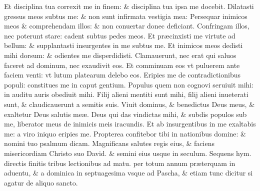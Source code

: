 \documentclass[a5paper,10pt]{book}
\def\ae{æ}
\begin{document}
\begin{multicols*}{2}
\newline \color{red} E\color{black}t disciplina tua correxit me in finem: \& disciplina tua ipsa me docebit.
\newline \color{red} D\color{black}ilatasti gressus meos subtus me: \& non sunt infirmata vestigia mea:
\newline \color{red} P\color{black}ersequar inimicos meos \& comprehendam illos: \& non conuertar donec deficiant.
\newline \color{red} C\color{black}onfringam illos, nec poterunt stare: cadent subtus pedes meos.
\newline \color{red} E\color{black}t pr\ae cinxisti me virtute ad bellum: \& supplantasti insurgentes in me subtus me.
\newline \color{red} E\color{black}t inimicos meos dedisti mihi dorsum: \& odientes me disperdidisti.
\newline \color{red} C\color{black}lamauerunt, nec erat qui saluos faceret ad dominum, nec exaudivit eos.
\newline \color{red} E\color{black}t comminuam eos vt puluerem ante faciem venti: vt lutum platearum delebo eos.%
\newline \color{red} E\color{black}ripies me de contradictionibus populi: constitues me in caput gentium.
\newline \color{red} P\color{black}opulus quem non cognovi seruiuit mihi: in auditu auris obediuit mihi.
\newline \color{red} F\color{black}ilij alieni mentiti sunt mihi, filij alieni inueterati sunt, \& claudicauerunt a semitis suis.
\newline \color{red} V\color{black}iuit dominus, \& benedictus Deus meus, \& exaltetur Deus salutis me\ae .
\newline \color{red} D\color{black}eus qui das vindictas mihi, \& subdis populos sub me, liberator meus de inimicis meis iracundis.
\newline \color{red} E\color{black}t ab insurgentibus in me exaltabis me: a viro iniquo eripies me.
\newline \color{red} P\color{black}ropterea confitebor tibi in nationibus domine: \& nomini tuo psalmum dicam.
\newline \color{red} M\color{black}agnificans salutes regis eius, \& faciens misericordiam Christo suo David. \& semini eius usque in seculum.
\newline {} \color{red} Sequens hym. directis %
finitis tribus lectionibus ad matu. per totum annum pr\ae terquam in aduentu, \& a dominica in septuagesima vsque ad Pascha, \& etiam tunc dicitur si agatur de aliquo sancto. \color{black}

\end{multicols*}
\end{document}
